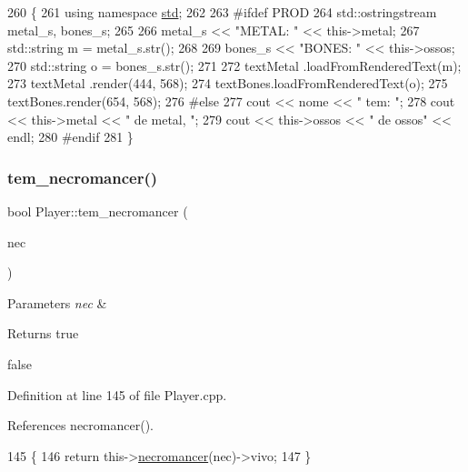 \begin{DoxyCode}
260                                             \{
261     \textcolor{keyword}{using namespace }\mbox{\hyperlink{namespacestd}{std}};
262 
263 \textcolor{preprocessor}{    #ifdef PROD}
264     std::ostringstream metal\_s, bones\_s;
265 
266     metal\_s << \textcolor{stringliteral}{"METAL: "} << this->metal;
267     std::string m = metal\_s.str();
268 
269     bones\_s << \textcolor{stringliteral}{"BONES: "} << this->ossos;
270     std::string o = bones\_s.str();
271 
272     textMetal .loadFromRenderedText(m);
273     textMetal .render(444, 568);
274     textBones.loadFromRenderedText(o);
275     textBones.render(654, 568);
276 \textcolor{preprocessor}{    #else}
277     cout << nome << \textcolor{stringliteral}{" tem: "};
278     cout << this->metal << \textcolor{stringliteral}{" de metal, "};
279     cout << this->ossos << \textcolor{stringliteral}{" de ossos"} << endl;
280 \textcolor{preprocessor}{    #endif}
281 \}
\end{DoxyCode}
\mbox{\label{class_player_aeff8c71e2c3e1a7529ec2190de0ac4cd}} 
\subsubsection{\texorpdfstring{tem\+\_\+necromancer()}{tem\_necromancer()}}
{\footnotesize\ttfamily bool Player\+::tem\+\_\+necromancer (\begin{DoxyParamCaption}\item[{Tipo\+Necromancer}]{nec }\end{DoxyParamCaption})}


\begin{DoxyParams}{Parameters}
{\em nec} & \\
\hline
\end{DoxyParams}
\begin{DoxyReturn}{Returns}
true 

false 
\end{DoxyReturn}


Definition at line 145 of file Player.\+cpp.



References necromancer().


\begin{DoxyCode}
145                                                 \{
146     \textcolor{keywordflow}{return} this->\mbox{\hyperlink{class_player_a560ffc698994e73527433dd2bf4d2c0d}{necromancer}}(nec)->vivo;
147 \}
\end{DoxyCode}
\mbox{\label{class_player_a063de6da853c618adcf8392ba639327c}} 
